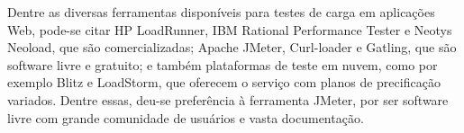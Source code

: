 \documentclass[12pt]{article}
\begin{document}




Dentre as diversas ferramentas disponíveis para testes de carga em aplicações Web, pode-se citar HP LoadRunner, IBM Rational Performance Tester e Neotys Neoload, que são comercializadas; Apache JMeter, Curl-loader e Gatling, que são software livre e gratuito; e também plataformas de teste em nuvem, como por exemplo Blitz e LoadStorm, que oferecem o serviço com planos de precificação variados. Dentre essas, deu-se preferência à ferramenta JMeter, por ser software livre com grande comunidade de usuários e vasta documentação.



\end{document}
